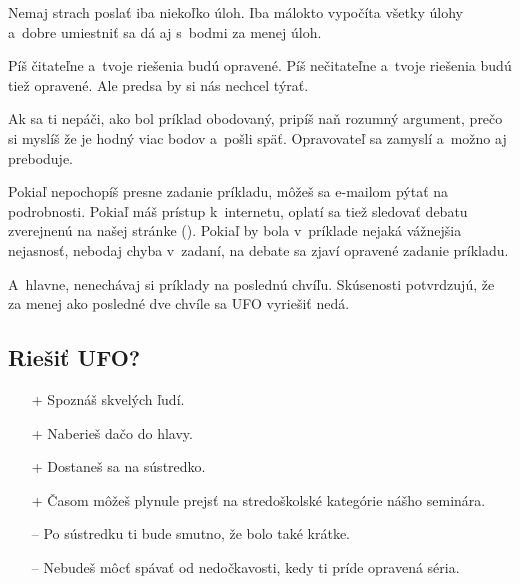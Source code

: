 	Nemaj strach poslať iba niekoľko úloh. Iba málokto vypočíta všetky úlohy a~dobre umiestniť sa dá aj s~bodmi za menej úloh.

	Píš čitateľne a~tvoje riešenia budú opravené. Píš nečitateľne a~tvoje riešenia budú tiež opravené. Ale predsa by si nás nechcel týrať.

	Ak sa ti nepáči, ako bol príklad obodovaný, pripíš naň rozumný argument, prečo si myslíš že je hodný viac bodov a~pošli späť. Opravovateľ sa zamyslí a~možno aj preboduje.

	Pokiaľ nepochopíš presne zadanie príkladu, môžeš sa e-mailom pýtať na podrobnosti. Pokiaľ máš prístup k~internetu, oplatí sa tiež sledovať debatu zverejnenú na našej stránke (\URL{\seminarURL}).
	Pokiaľ by bola v~príklade nejaká vážnejšia nejasnosť, nebodaj chyba v~zadaní, na debate sa zjaví opravené zadanie príkladu.

	A~hlavne, nenechávaj si príklady na poslednú chvíľu. Skúsenosti potvrdzujú, že za menej ako posledné dve chvíle sa UFO vyriešiť nedá.

\subsection{Riešiť UFO?}
	\begin{itemize}
		\item[+] Spoznáš skvelých ľudí.
		\item[+] Naberieš dačo do hlavy.
		\item[+] Dostaneš sa na sústredko.
		\item[+] Časom môžeš plynule prejsť na stredoškolské kategórie nášho seminára.

		\item[--] Po sústredku ti bude smutno, že bolo také krátke.
		\item[--] Nebudeš môcť spávať od nedočkavosti, kedy ti príde opravená séria.
	\end{itemize}
